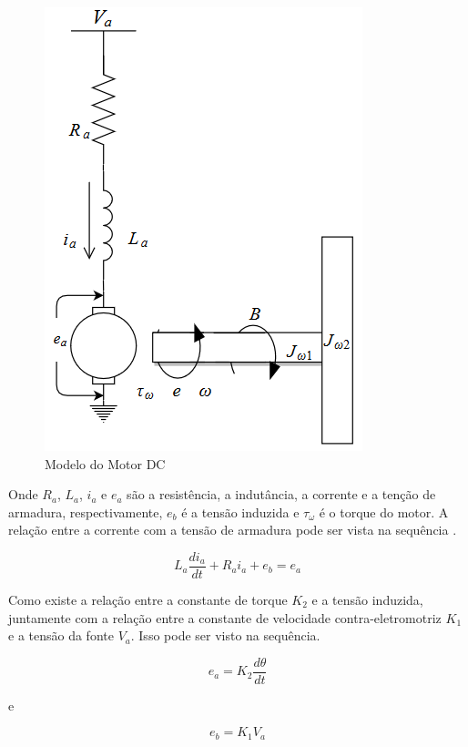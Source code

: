 \begin{figure}[H]
  \caption{Modelo do Motor DC}
  \begin{center}
      \includegraphics[scale=.7]{img/modelo_motor_dc}
  \end{center}
  \label{fig:modelo_motor_dc}
\end{figure}

Onde $R_a$, $L_a$, $i_a$ e $e_a$ são a resistência, a indutância, a corrente e a tenção de armadura, respectivamente, $e_b$ é a tensão induzida e $\tau_{\omega}$ é o torque do motor. A relação entre a corrente com a tensão de armadura pode ser vista na sequência \cite{Ogata}.

\begin{equation}
L_a \frac{di_a}{dt}+R_a i_a + e_b = e_a
\end{equation}

Como existe a relação entre a constante de torque $K_2$ e a tensão induzida, juntamente com a relação entre a constante de velocidade contra-eletromotriz $K_1$ e a tensão da fonte $V_a$. Isso pode ser visto na sequência.

\begin{equation}
  e_a = K_2\frac{d\theta}{dt}
\end{equation}

e

\begin{equation}
  e_b = K_1V_a
\end{equation}

